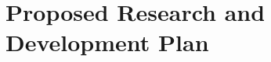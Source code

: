 \documentclass[10pt,letterpaper]{article}
\newcommand{\up}{\vspace*{-0.25em}}
\begin{document}
\section{Proposed Research and Development Plan}





\end{document}
